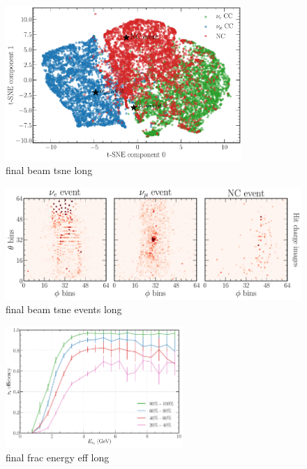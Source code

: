 \begin{figure} %
    \includegraphics[width=0.8\textwidth]{diagrams/7-cvn/chipsnet/final_beam_tsne.pdf}
    \caption[final beam tsne short]
    {final beam tsne long}
    \label{fig:final_beam_tsne}
\end{figure}

\begin{figure} %
    \includegraphics[width=\textwidth]{diagrams/7-cvn/chipsnet/final_beam_tsne_events.pdf}
    \caption[final beam tsne events short]
    {final beam tsne events long}
    \label{fig:final_beam_tsne_events}
\end{figure}

\begin{figure} %
    \includegraphics[width=0.6\textwidth]{diagrams/7-cvn/chipsnet/final_frac_energy_eff.pdf}
    \caption[final frac energy eff short]
    {final frac energy eff long}
    \label{fig:final_frac_energy_eff}
\end{figure}

